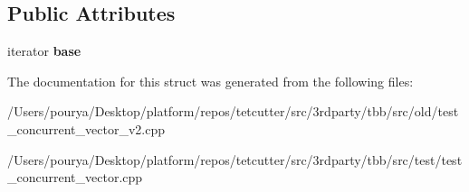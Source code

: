 \subsection*{Public Attributes}
\begin{DoxyCompactItemize}
\item 
\hypertarget{structAssignElement_ace1be1e9a6e8505c1e591a4217c15f50}{}iterator {\bfseries base}\label{structAssignElement_ace1be1e9a6e8505c1e591a4217c15f50}

\end{DoxyCompactItemize}


The documentation for this struct was generated from the following files\+:\begin{DoxyCompactItemize}
\item 
/\+Users/pourya/\+Desktop/platform/repos/tetcutter/src/3rdparty/tbb/src/old/test\+\_\+concurrent\+\_\+vector\+\_\+v2.\+cpp\item 
/\+Users/pourya/\+Desktop/platform/repos/tetcutter/src/3rdparty/tbb/src/test/test\+\_\+concurrent\+\_\+vector.\+cpp\end{DoxyCompactItemize}
